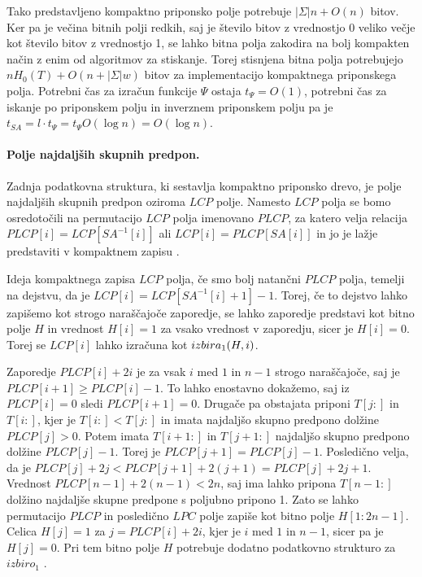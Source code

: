 Tako predstavljeno kompaktno priponsko polje potrebuje $|\Sigma|n + O(n)$ bitov. Ker pa je večina bitnih polji redkih, saj je število bitov z vrednostjo 0 veliko večje kot število bitov z vrednostjo 1, se lahko bitna polja zakodira na bolj kompakten način z enim od algoritmov za stiskanje. Torej stisnjena bitna polja potrebujejo $nH_0(T)+O(n+|\Sigma|w)$ bitov za implementacijo kompaktnega priponskega polja. Potrebni čas za izračun funkcije $\Psi$ ostaja $t_\Psi=O(1)$, potrebni čas za iskanje po priponskem polju in inverznem priponskem polju pa je $t_{SA}=l\cdot t_\Psi = t_\Psi O(\log{n}) = O(\log{n})$.


\paragraph{Polje najdaljših skupnih predpon.}
Zadnja podatkovna struktura, ki sestavlja kompaktno priponsko drevo, je polje najdaljših skupnih predpon oziroma $LCP$ polje. Namesto $LCP$ polja se bomo osredotočili na permutacijo $LCP$ polja imenovano $PLCP$, za katero velja relacija $PLCP[i]=LCP[SA^{-1}[i]]$ ali $LCP[i]=PLCP[SA[i]]$ in jo je lažje predstaviti v kompaktnem zapisu \cite{Navarro2016, Sadakane2007}.

Ideja kompaktnega zapisa $LCP$ polja, če smo bolj natančni $PLCP$ polja, temelji na dejstvu, da je $LCP[i]=LCP[SA^{-1}[i]+1]-1$. Torej, če to dejstvo lahko zapišemo kot strogo naraščajoče zaporedje, se lahko zaporedje predstavi kot bitno polje $H$ in vrednost $H[i]=1$ za vsako vrednost v zaporedju, sicer je $H[i]=0$. Torej se $LCP[i]$ lahko izračuna kot $ \mathop{izbira}\nolimits_{1}(H,i)$.

Zaporedje $PLCP[i]+2i$ je za vsak $i$ med $1$ in $n-1$ strogo naraščajoče, saj je $PLCP[i+1]\ge PLCP[i]-1$. To lahko enostavno dokažemo, saj iz $PLCP[i]=0$ sledi $PLCP[i+1]=0$. Drugače pa obstajata priponi $T[j:]$ in $T[i:]$, kjer je $T[i:]<T[j:]$ in imata najdaljšo skupno predpono dolžine $PLCP[j]>0$. Potem imata $T[i+1:]$ in $T[j+1:]$ najdaljšo skupno predpono dolžine $PLCP[j]-1$. Torej je $PLCP[j+1] = PLCP[j]-1$. Posledično velja, da je $PLCP[j]+2j<PLCP[j+1]+2(j+1)= PLCP[j]+2j+1$. Vrednost $PLCP[n-1]+2(n-1)< 2n$, saj ima lahko pripona $T[n-1:]$ dolžino najdaljše skupne predpone s poljubno pripono 1. Zato se lahko permutacijo $PLCP$ in posledično $LPC$ polje zapiše kot bitno polje $H[1:2n-1]$. Celica $H[j]=1$ za $j=PLCP[i]+2i$, kjer je $i$ med $1$ in $n-1$, sicer pa je $H[j]=0$. Pri tem bitno polje $H$ potrebuje dodatno podatkovno strukturo za $izbiro_1$ \cite{Navarro2016, Sadakane2007}.

